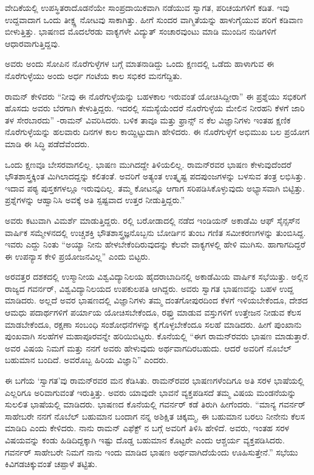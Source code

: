 ವೇದಿಕೆಯಲ್ಲಿ ಉಪಸ್ಥಿತರಾದೊಡನೆಯೇ ಸಾಂಪ್ರದಾಯಿಕವಾಗಿ ನಡೆಯುವ ಸ್ವಾಗತ, ಪರಿಚಯಗಳಿಗೆ ಕಡಿತ. ಇವು ಉದ್ದವಾದಾಗ ಒಂದು ತೀಕ್ಷ್ಣ ನೋಟವು ಸಾಕಾಗಿತ್ತು. ಹೀಗೆ ಸುಂದರ ವಾಗ್ಮಿತೆಯನ್ನು ಹಾಳುಗೈಯುವ ಪರಿಗೆ ಕಡಿವಾಣ ಬೀಳುತ್ತಿತ್ತು. ಭಾಷಣದ ಮೊದಲೆರಡು ವಾಕ್ಯಗಳೇ ವಿದ್ಯುತ್ ಸಂಚಾರವುಂಟು ಮಾಡಿ ಮುಂದಿನ ನುಡಿಗಳಿಗೆ ಆಧಾರವಾಗುತ್ತಿದ್ದವು.

ಅವರು ಅಂದು ಸೋಪಿನ ನೊರೆಗುಳ್ಳೆಗಳ ಬಗ್ಗೆ ಮಾತನಾಡಿದ್ದು ಒಂದು ಕ್ಷಣದಲ್ಲಿ ಒಡೆದು ಹಾಳಾಗುವ ಈ ನೊರೆಗುಳ್ಳೆಯು ಅಂದು ಅರ್ಧ ಗಂಟೆಯ ಕಾಲ ಸಭಿಕರ ಮನಗೆದ್ದಿತು.

ರಾಮನ್ ಕೇಳಿದರು  “ನೀವು ಈ ನೊರೆಗುಳ್ಳೆಯನ್ನು ಬಹಳಕಾಲ ಇರುವಂತೆ ಯೋಚಿಸಿದ್ದೀರಾ” ಈ ಪ್ರಶ್ನೆಯು ಸಭಿಕರಿಗೆ ಹೊಸದು ಅವರು ಬೆರಗಾಗಿ ಕೇಳುತ್ತಿದ್ದರು. ಇದರಲ್ಲಿ ಸಮಸ್ಯೆಯೆಂದರೆ ನೊರೆಗುಳ್ಳೆಯ ಮೇಲಿನ ನೀರಹನಿ ಕೆಳಗೆ ಜಾರಿ ತಳ ಸೇರಬಾರದು” -ರಾಮನ್ ವಿವರಿಸಿದರು. ಬಳಿಕ ತಾವೂ ಮತ್ತು ಫ್ರಾನ್ಸ್ ನ ಕೆಲ ವಿಜ್ಞಾನಿಗಳು ಇಂತಹ ಕ್ಷಣಿಕ ನೊರೆಗುಳ್ಳೆಯನ್ನು ಹಲವಾರು ದಿನಗಳ ಕಾಲ ಕಾಯ್ದಿಟ್ಟುದಾಗಿ ಹೇಳಿದರು. ಈ ನೊರೆಗುಳ್ಳೆಗೆ ಅಭಿಮುಖ ಬಲ ಪ್ರಯೋಗ ಮಾಡಿ ಈ ಸಿದ್ಧಿ ಪಡೆದೆವೆಂದರು.

ಒಂದು ಕ್ಷಣವೂ ಬೇಸರವಾಗಲಿಲ್ಲ. ಭಾಷಣ ಮುಗಿದದ್ದೇ ತಿಳಿಯಲಿಲ್ಲ. ರಾಮನ್‍ರವರ ಭಾಷಣ ಕೇಳುವುದೆಂದರೆ ಭೌತಶಾಸ್ತ್ರಕ್ಕಿಂತ ಮಿಗಿಲಾದದ್ದನ್ನು ಕಲಿತಂತೆ. ಅವರಿಗೆ ಅತ್ಯಂತ ಉತ್ಕೃಷ್ಟ ಪದಪುಂಜಗಳನ್ನು ಬಳಸುವ ತಂತ್ರ ಲಭಿಸಿತ್ತು. ಇದಾವ ಪಠ್ಯ ಪುಸ್ತಕಗಳಲ್ಲೂ ಇರುವುದಿಲ್ಲ. ತಮ್ಮ ಕೋಟನ್ನೂ ಆಗಾಗ ಸರಿಪಡಿಸಿಕೊಳ್ಳುವುದು ಅಭ್ಯಾಸವಾಗಿ ಬಿಟ್ಟಿತ್ತು. ಪ್ರಶ್ನೆಗಳನ್ನು ಆಹ್ವಾನಿಸಿ ಅವಕ್ಕೆ ಅತಿ ಸ್ಪಷ್ಟವಾದ ಉತ್ತರ ನೀಡುತ್ತಿದ್ದರು.”

ಅವರು ಕಟುವಾಗಿ ವಿಮರ್ಶೆ ಮಾಡುತ್ತಿದ್ದರು. ರಲ್ಲಿ ಬರೋಡಾದಲ್ಲಿ ನಡೆದ ಇಂಡಿಯನ್ ಅಕಾಡೆಮಿ ಆಫ್ ಸೈನ್ಸಸ್‍ನ ವಾರ್ಷಿಕ ಸಮ್ಮೇಳನದಲ್ಲಿ ಉಚ್ಚಶಕ್ತಿ ಭೌತಶಾಸ್ತ್ರಜ್ಞನೊಬ್ಬನು ಬೋರ್ಡಿನ ತುಂಬ ಗಣಿತ ಸಮೀಕರಣಗಳನ್ನು ತುಂಬಿಸಿದ್ದ. ಇವರು ಎದ್ದು ನಿಂತು “ಅಯ್ಯಾ ನೀನು ಹೇಳಬೇಕೆಂದಿರುವುದನ್ನು ಕೆಲವೇ ವಾಕ್ಯಗಳಲ್ಲಿ ಹೇಳಿ ಮುಗಿಸು. ಹಾಗಾಗದಿದ್ದರೆ ಈ ಉಪನ್ಯಾಸ ಕೇಳಿ ಪ್ರಯೋಜನವಿಲ್ಲ” ಎಂದು ಬಿಟ್ಟರು.

ಅರವತ್ತರ ದಶಕದಲ್ಲಿ ಉಸ್ಮಾನೀಯ ವಿಶ್ವವಿದ್ಯಾನಿಲಯ ಹೈದರಾಬಾದಿನಲ್ಲಿ ಅಕಾಡೆಮಿಯ ವಾರ್ಷಿಕ ಸಭೆಯಿತ್ತು. ಅಲ್ಲಿನ ರಾಜ್ಯದ ಗವರ್ನರ್, ವಿಶ್ವವಿದ್ಯಾನಿಲಯದ ಉಪಕುಲಪತಿ ಆಗಿದ್ದರು. ಅವರು ಸ್ವಾಗತ ಭಾಷಣವನ್ನು ಬಹಳ ಉದ್ದ ಮಾಡಿದರು. ಅಲ್ಲದೆ ಅವರ ಭಾಷಣದಲ್ಲಿ ವಿಜ್ಞಾನಿಗಳು ತಮ್ಮ ದಂತಗೋಪುರದಿಂದ ಕೆಳಗೆ ಇಳಿಯಬೇಕೆಂದೂ, ದೇಶದ ಆಮಧು ಪದಾರ್ಥಗಳಿಗೆ ಪರ್ಯಾಯ ಯೋಚಿಸಬೇಕೆಂದೂ, ರಫ್ತು ಮಾಡುವ ವಸ್ತುಗಳಿಗೆ ಉತ್ತೇಜನ ನೀಡುವ ಕೆಲಸ ಮಾಡಬೇಕೆಂದೂ, ರಕ್ಷಣಾ ಸಂಬಂಧಿ ಸಂಶೋಧನೆಗಳನ್ನು ಕೈಗೊಳ್ಳಬೇಕೆಂದೂ ಸಲಹೆ ಮಾಡಿದರು. ಹೀಗೆ ಪುಂಖಾನು ಪುಂಖವಾಗಿ ಸಲಹೆಗಳ ಮಹಾಪೂರವನ್ನೇ ಹರಿಯಿಬಿಟ್ಟರು. ಕೊನೆಯಲ್ಲಿ “ಈಗ ರಾಮನ್‍ರವರು ಭಾಷಣ ಮಾಡುತ್ತಾರೆ. ಅವರ ವಿಷಯ \textit{} ನಿಮಗೆ ಮತ್ತು ನನಗೆ ಅವರು ಹೇಳುವುದು ಅರ್ಥವಾಗದಿರಬಹುದು. ಆದರೆ ಅವರಿಗೆ ನೊಬೆಲ್ ಬಹುಮಾನ ಬಂದಿದೆ. ಅವರೊಬ್ಬ ಹಿರಿಯ ವಿಜ್ಞಾನಿ” ಎಂದರು.

ಈ ಬಗೆಯ ‘ಸ್ವಾಗತ’ವು ರಾಮನ್‍ರವರ ಮನ ಕೆಡಿಸಿತು. ರಾಮನ್‍ರವರ ಭಾಷಣಗಳೆಂದಿಗೂ ಅತಿ ಸರಳ ಭಾಷೆಯಲ್ಲಿ ಎಲ್ಲರಿಗೂ ಅರಿವಾಗುವಂತೆ ಇರುತ್ತಿತ್ತು. ಅವರು ಯಾವುದೇ ಭಾವನೆ ವ್ಯಕ್ತಪಡಿಸದೆ ತಮ್ಮ ವಿಷಯ ಮಂಡನೆಯನ್ನು ಸುಲಲಿತ ಭಾಷೆಯಲ್ಲಿ ಮಾಡಿದರು. ಭಾಷಣದ ಕೊನೆಯಲ್ಲಿ ಗವರ್ನರ್ ಕಡೆ ತಿರುಗಿ ಹೀಗೆಂದರು. “ಮಾನ್ಯ ಗವರ್ನರ್ ಸಾಹೇಬರೇ ನನಗೆ ನೊಬೆಲ್ ಬಹುಮಾನ ಬಂದಾಗ ನನ್ನ ಅಶಿಕ್ಷಿತ ಚಿಕ್ಕಮ್ಮ, ಈ ಬಹುಮಾನ ಬರಲು ನೀನೇನು ಕೆಲಸ ಮಾಡಿದಿ ಎಂದು ಕೇಳಿದರು. ನಾನು ರಾಮನ್ ಎಫೆಕ್ಟ್ ನ ಬಗ್ಗೆ ಅವರಿಗೆ ತಿಳಿಸಿ ಹೇಳಿದೆ. ಅವರು, ಇಂತಹ ಸರಳ ವಿಷಯವನ್ನು ಕಂಡು ಹಿಡಿದಿದ್ದಕ್ಕಾಗಿ ಇಷ್ಟು ದೊಡ್ಡ ಬಹುಮಾನ ಕೊಟ್ಟರೇ ಎಂದು ಆಶ್ಚರ್ಯ ವ್ಯಕ್ತಪಡಿಸಿದರು. ಗವರ್ನರ್ ಸಾಹೇಬರೇ ನಿಮಗೆ ನಾನು ಇಂದು ಮಾಡಿದ ಭಾಷಣ ಅರ್ಥವಾಗಿದೆಯೆಂದು ಊಹಿಸುತ್ತೇನೆ.” ಸಭೆಯು ಕಿವಿಗಡಚಿಕ್ಕುವಂತೆ ಚಪ್ಪಾಳೆ ತಟ್ಟಿತು.

